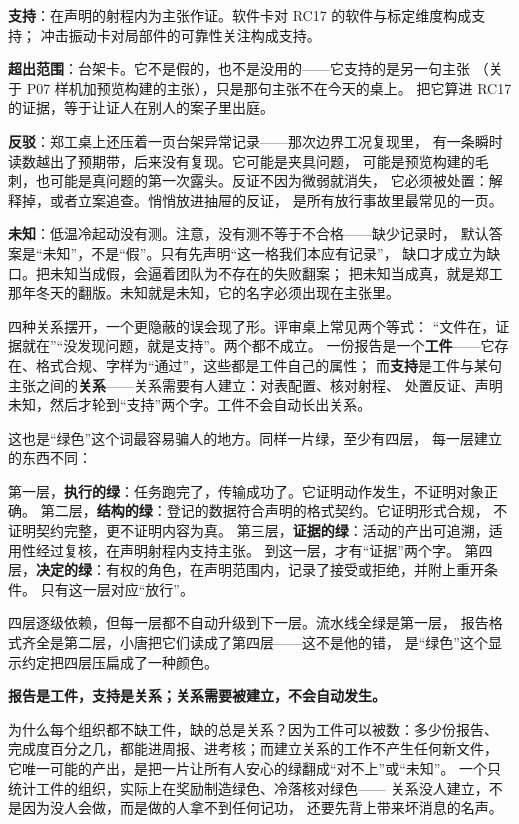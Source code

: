 \textbf{支持}：在声明的射程内为主张作证。软件卡对 RC17 的软件与标定维度构成支持；
冲击振动卡对局部件的可靠性关注构成支持。

\textbf{超出范围}：台架卡。它不是假的，也不是没用的——它支持的是另一句主张
（关于 P07 样机加预览构建的主张），只是那句主张不在今天的桌上。
把它算进 RC17 的证据，等于让证人在别人的案子里出庭。

\textbf{反驳}：郑工桌上还压着一页台架异常记录——那次边界工况复现里，
有一条瞬时读数越出了预期带，后来没有复现。它可能是夹具问题，
可能是预览构建的毛刺，也可能是真问题的第一次露头。反证不因为微弱就消失，
它必须被处置：解释掉，或者立案追查。悄悄放进抽屉的反证，
是所有放行事故里最常见的一页。

\textbf{未知}：低温冷起动没有测。注意，没有测不等于不合格——缺少记录时，
默认答案是“未知”，不是“假”。只有先声明“这一格我们本应有记录”，
缺口才成立为缺口。把未知当成假，会逼着团队为不存在的失败翻案；
把未知当成真，就是郑工那年冬天的翻版。未知就是未知，它的名字必须出现在主张里。

四种关系摆开，一个更隐蔽的误会现了形。评审桌上常见两个等式：
“文件在，证据就在”“没发现问题，就是支持”。两个都不成立。
一份报告是一个\textbf{工件}——它存在、格式合规、字样为“通过”，这些都是工件自己的属性；
而\textbf{支持}是工件与某句主张之间的\textbf{关系}——关系需要有人建立：对表配置、核对射程、
处置反证、声明未知，然后才轮到“支持”两个字。工件不会自动长出关系。

这也是“绿色”这个词最容易骗人的地方。同样一片绿，至少有四层，
每一层建立的东西不同：

第一层，\textbf{执行的绿}：任务跑完了，传输成功了。它证明动作发生，不证明对象正确。
第二层，\textbf{结构的绿}：登记的数据符合声明的格式契约。它证明形式合规，
不证明契约完整，更不证明内容为真。
第三层，\textbf{证据的绿}：活动的产出可追溯，适用性经过复核，在声明射程内支持主张。
到这一层，才有“证据”两个字。
第四层，\textbf{决定的绿}：有权的角色，在声明范围内，记录了接受或拒绝，并附上重开条件。
只有这一层对应“放行”。

四层逐级依赖，但每一层都不自动升级到下一层。流水线全绿是第一层，
报告格式齐全是第二层，小唐把它们读成了第四层——这不是他的错，
是“绿色”这个显示约定把四层压扁成了一种颜色。

\textbf{报告是工件，支持是关系；关系需要被建立，不会自动发生。}

为什么每个组织都不缺工件，缺的总是关系？因为工件可以被数：多少份报告、
完成度百分之几，都能进周报、进考核；而建立关系的工作不产生任何新文件，
它唯一可能的产出，是把一片让所有人安心的绿翻成“对不上”或“未知”。
一个只统计工件的组织，实际上在奖励制造绿色、冷落核对绿色——
关系没人建立，不是因为没人会做，而是做的人拿不到任何记功，
还要先背上带来坏消息的名声。

